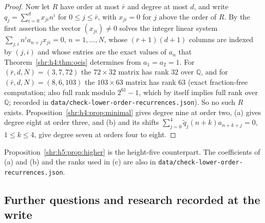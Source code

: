 \documentclass[11pt,letterpaper]{article}
\numberwithin{equation}{section}
\theoremstyle{definition}
\newcommand{\Q}{\mathbb Q}
\newcommand{\1}{\mathbf 1}
\begin{document}
\begin{proof}
Now let $R$ have order at most $\bar r$ and degree at most $d$, and write
$q_j=\sum_{i=0}^dx_{ji}n^i$ for $0\le j\le\bar r$, with $x_{ji}=0$ for $j$
above the order of $R$. By the first assertion the vector
$(x_{ji})\ne0$ solves the integer linear system
$\sum_{j,i}n^ia_{n+j}x_{ji}=0$, $n=1,\ldots,N$, whose $(\bar r+1)(d+1)$
columns are indexed by $(j,i)$ and whose entries are the exact values of
$a_n$ that Theorem~\ref{shr:h4:thm:oeis} determines from $a_1=a_2=1$. For
$(\bar r,d,N)=(3,7,72)$ the $72\times32$ matrix has rank $32$ over $\Q$,
and for $(\bar r,d,N)=(8,6,103)$ the $103\times63$ matrix has rank $63$
(exact fraction-free computation; also full rank modulo $2^{61}-1$, which
by itself implies full rank over $\Q$; recorded in \texttt{data/\allowbreak check-\allowbreak lower-\allowbreak order-\allowbreak recurrences.\allowbreak json}). So no such $R$
exists. Proposition~\ref{shr:h4:prop:minimal} gives degree nine at order
two, (a) gives degree eight at order three, and (b) and its shifts
$\sum_{j=0}^4\tilde q_j(n+k)a_{n+k+j}=0$, $1\le k\le4$, give degree seven at
orders four to eight.
\end{proof}

Proposition~\ref{shr:h5:prop:higher} is the height-five counterpart. The
coefficients of (a) and (b) and the ranks used in (c) are also in
\texttt{data/\allowbreak check-\allowbreak lower-\allowbreak order-\allowbreak recurrences.\allowbreak json}.

\subsection{Further questions and research recorded at the write}
\label{shr:h4:sec:further}
\end{document}
